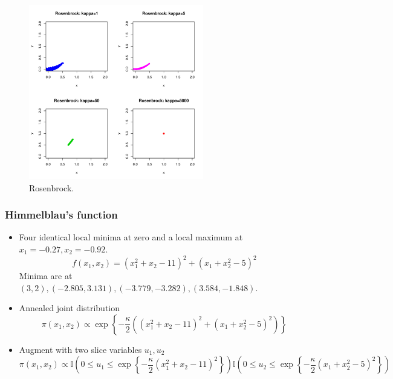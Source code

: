 \documentclass[notes=show,smaller]{beamer}
\begin{document}
\begin{frame}


\begin{figure}[hbp]
\includegraphics[height=3in,width=\textwidth]{john-rosen.pdf}
\caption{Rosenbrock.}
\end{figure}

\end{frame}
\begin{frame}
\frametitle{Himmelblau's function}

\footnotesize
\begin{itemize}
\item
Four identical local minima at zero and a local maximum at $ x_1=-0.27, x_2=-0.92 $.
$$
f(x_1,x_2) =  ( x^2_1 + x_2 - 11 )^2 + (  x_1 + x_2^2 - 5 )^2
$$
Minima are at $ (3,2) , (-2.805, 3.131 ), (-3.779 , -3.282) , (3.584 , -1.848 ) $.
\item
Annealed joint distribution
$$
\pi ( x_1 , x_2 ) \propto \exp \left \{ - \frac{\kappa}{2} \left (  ( x^2_1 + x_2 - 11 )^2 + (  x_1 + x_2^2 - 5 )^2 \right ) \right \}
$$
\item
Augment with two slice variables $ u_1, u_2 $
$$
\pi ( x_1 , x_2 ) \propto \mathbb{I} \left ( 0 \leq u_1 \leq \exp \left \{ - \frac{\kappa}{2} ( x^2_1 + x_2 - 11 )^2 \right \} \right )
 \mathbb{I} \left ( 0 \leq u_2 \leq \exp \left \{ - \frac{\kappa}{2} (  x_1 + x_2^2 - 5 )^2  \right \} \right )
$$
\end{itemize}
\normalsize
\end{frame}
\end{document}
